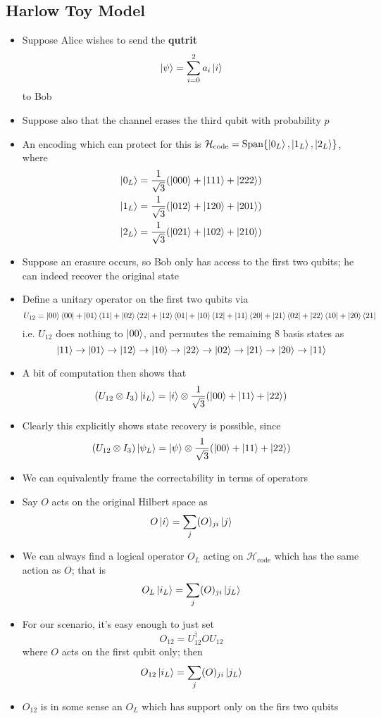 \documentclass[12pt,a4paper]{article}
\numberwithin{equation}{section}
\newcommand{\ketbra}[2]{\ket{#1}\bra{#2}}
\newcommand{\ketbras}[1]{\ketbra{#1}{#1}}
\begin{document}
	\subsection{Harlow Toy Model}
	\begin{itemize}
		\item Suppose Alice wishes to send the \textbf{qutrit} 
		$$
			\ket{\psi}=\sum_{i=0}^{2}a_{i}\ket{i}
		$$
		to Bob
		\item Suppose also that the channel erases the third qubit with probability $p$
		\item An encoding which can protect for this is $\mathcal{H}_{\text{code}}=\text{Span}\{\ket{0_{L}},\ket{1_{L}},\ket{2_{L}}\}$, where
		$$
			\begin{aligned}
				\ket{0_{L}}&=\frac{1}{\sqrt{3}}(\ket{000}+\ket{111}+\ket{222})\\
				\ket{1_{L}}&=\frac{1}{\sqrt{3}}(\ket{012}+\ket{120}+\ket{201})\\
				\ket{2_{L}}&=\frac{1}{\sqrt{3}}(\ket{021}+\ket{102}+\ket{210})
			\end{aligned}
		$$
		\item Suppose an erasure occurs, so Bob only has access to the first two qubits; he can indeed recover the original state
		\item Define a unitary operator on the first two qubits via
		$$
			U_{12}=\ketbras{00}+\ketbra{01}{11}+\ketbra{02}{22}+\ketbra{12}{01}+\ketbra{10}{12}+\ketbra{11}{20}+\ketbra{21}{02}+\ketbra{22}{10}+\ketbra{20}{21}
		$$
		i.e. $U_{12}$ does nothing to $\ket{00}$, and permutes the remaining 8 basis states as
		$$
			\ket{11}\to\ket{01}\to\ket{12}\to\ket{10}\to\ket{22}\to\ket{02}\to\ket{21}\to\ket{20}\to\ket{11}
		$$
		\item A bit of computation then shows that
		$$
			(U_{12}\otimes I_{3})\ket{i_{L}}=\ket{i}\otimes\frac{1}{\sqrt{3}}(\ket{00}+\ket{11}+\ket{22})
		$$
		\item Clearly this explicitly shows state recovery is possible, since
		$$
			(U_{12}\otimes I_{3})\ket{\psi_{L}}=\ket{\psi}\otimes\frac{1}{\sqrt{3}}(\ket{00}+\ket{11}+\ket{22})
		$$
		\item We can equivalently frame the correctability in terms of operators
		\item Say $O$ acts on the original Hilbert space as
		$$
			O\ket{i}=\sum_{j}(O)_{ji}\ket{j}
		$$
		\item We can always find a logical operator $O_{L}$ acting on $\mathcal{H}_{\text{code}}$ which has the same action as $O$; that is
		$$
			O_{L}\ket{i_{L}}=\sum_{j}(O)_{ji}\ket{j_{L}}
		$$
		\item For our scenario, it's easy enough to just set
		$$
			O_{12}=U_{12}^{\dagger}OU_{12}
		$$
		where $O$ acts on the first qubit only; then
		$$
			O_{12}\ket{i_{L}}=\sum_{j}(O)_{ji}\ket{j_{L}}
		$$
		\item $O_{12}$ is in some sense an $O_{L}$ which has support only on the firs two qubits
	\end{itemize}
\end{document}

